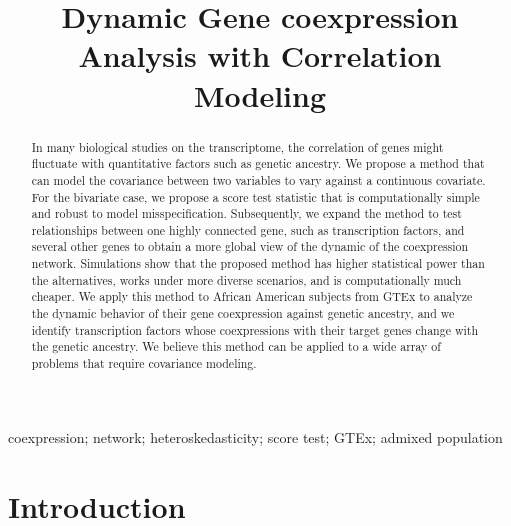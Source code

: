 \documentclass[aap,authoryear, preprint]{imsart}
\numberwithin{equation}{section}
\theoremstyle{plain}
\begin{document}
\begin{frontmatter}
\title{Dynamic Gene coexpression Analysis with Correlation Modeling}


\begin{abstract}
In many biological studies on the transcriptome, the correlation of genes might fluctuate with quantitative factors such as genetic ancestry. We propose a method that can model the covariance between two variables to vary against a continuous covariate. For the bivariate case, we propose a score test statistic that is computationally simple and robust to model misspecification. Subsequently, we expand the method to test relationships between one highly connected gene, such as transcription factors, and several other genes to obtain a more global view of the dynamic of the coexpression network. Simulations show that the proposed method has higher statistical power than the alternatives, works under more diverse scenarios, and is computationally much cheaper. We apply this method to African American subjects from GTEx to analyze the dynamic behavior of their gene coexpression against genetic ancestry, and we identify transcription factors whose coexpressions with their target genes change with the genetic ancestry. We believe this method can be applied to a wide array of problems that require covariance modeling.
\end{abstract}

\begin{keyword}
coexpression; network; heteroskedasticity; score test; GTEx; admixed population
\end{keyword}

\end{frontmatter}
\section{Introduction}
\end{document}
